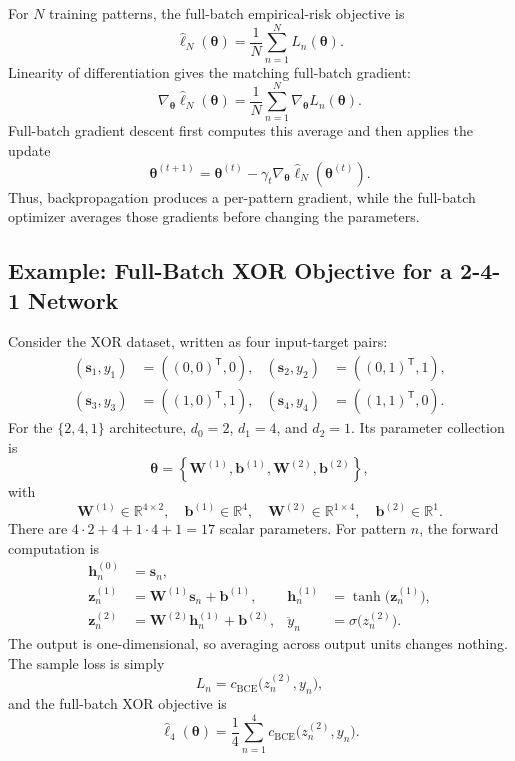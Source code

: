 \documentclass{article}
\begin{document}
For \(N\) training patterns, the full-batch empirical-risk objective is
\[
  \widehat{\ell}_N(\boldsymbol\theta)
  =
  \frac{1}{N}
  \sum_{n=1}^{N}
  L_n(\boldsymbol\theta).
\]
Linearity of differentiation gives the matching full-batch gradient:
\[
  \nabla_{\boldsymbol\theta}
  \widehat{\ell}_N(\boldsymbol\theta)
  =
  \frac{1}{N}
  \sum_{n=1}^{N}
  \nabla_{\boldsymbol\theta}L_n(\boldsymbol\theta).
\]
Full-batch gradient descent first computes this average and then applies
the update
\[
  \boxed{
    \boldsymbol\theta^{(t+1)}
    =
    \boldsymbol\theta^{(t)}
    -
    \gamma_t
    \nabla_{\boldsymbol\theta}
    \widehat{\ell}_N\left(\boldsymbol\theta^{(t)}\right).
  }
\]
Thus, backpropagation produces a per-pattern gradient, while the
full-batch optimizer averages those gradients before changing the
parameters.

\subsection{Example: Full-Batch XOR Objective for a 2-4-1 Network}

Consider the XOR dataset, written as four input-target pairs:
\[
  \begin{aligned}
    (\mathbf{s}_1,y_1)&=((0,0)^\mathsf{T},0),&
    (\mathbf{s}_2,y_2)&=((0,1)^\mathsf{T},1),\\
    (\mathbf{s}_3,y_3)&=((1,0)^\mathsf{T},1),&
    (\mathbf{s}_4,y_4)&=((1,1)^\mathsf{T},0).
  \end{aligned}
\]
For the \(\{2,4,1\}\) architecture, \(d_0=2\), \(d_1=4\), and
\(d_2=1\). Its parameter collection is
\[
  \boldsymbol\theta
  =
  \left\{
    \mathbf{W}^{(1)},\mathbf{b}^{(1)},
    \mathbf{W}^{(2)},\mathbf{b}^{(2)}
  \right\},
\]
with
\[
  \mathbf{W}^{(1)}\in\mathbb{R}^{4\times 2},
  \quad
  \mathbf{b}^{(1)}\in\mathbb{R}^{4},
  \quad
  \mathbf{W}^{(2)}\in\mathbb{R}^{1\times 4},
  \quad
  \mathbf{b}^{(2)}\in\mathbb{R}^{1}.
\]
There are \(4\cdot2+4+1\cdot4+1=17\) scalar parameters. For pattern
\(n\), the forward computation is
\[
  \begin{aligned}
    \mathbf{h}_n^{(0)}&=\mathbf{s}_n,\\
    \mathbf{z}_n^{(1)}
    &=
    \mathbf{W}^{(1)}\mathbf{s}_n+\mathbf{b}^{(1)},&
    \mathbf{h}_n^{(1)}
    &=
    \tanh\bigl(\mathbf{z}_n^{(1)}\bigr),\\
    \mathbf{z}_n^{(2)}
    &=
    \mathbf{W}^{(2)}\mathbf{h}_n^{(1)}+\mathbf{b}^{(2)},&
    \ddot{y}_n
    &=
    \sigma\bigl(z_n^{(2)}\bigr).
  \end{aligned}
\]
The output is one-dimensional, so averaging across output units changes
nothing. The sample loss is simply
\[
  L_n
  =
  c_{\mathrm{BCE}}\bigl(z_n^{(2)},y_n\bigr),
\]
and the full-batch XOR objective is
\[
  \widehat{\ell}_4(\boldsymbol\theta)
  =
  \frac{1}{4}
  \sum_{n=1}^{4}
  c_{\mathrm{BCE}}\bigl(z_n^{(2)},y_n\bigr).
\]
\end{document}
